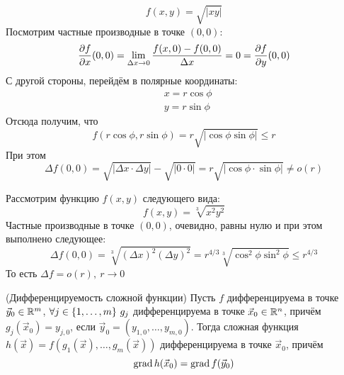 \begin{example}
	\[
		f(x, y) = \sqrt{|xy|}
	\]
	Посмотрим частные производные в точке $(0, 0)$:
	\[
		\frac{\partial f}{\partial x} (0, 0) = \lim\limits_{\Delta x \to 0} \frac{f(x, 0) - f(0, 0)}{\Delta x} = 0 = \frac{\partial f}{\partial y} (0, 0)
	\]
	С другой стороны, перейдём в полярные координаты:
	\begin{align*}
		&{x = r \cos \phi}
		\\
		&{y = r \sin \phi}
	\end{align*}
	Отсюда получим, что
	\[
		f(r \cos \phi, r \sin \phi) = r \sqrt{|\cos \phi \sin \phi|} \le r
	\]
	При этом
	\[
		\Delta f(0, 0) = \sqrt{|\Delta x \cdot \Delta y|} - \sqrt{|0 \cdot 0|} = r \sqrt{|\cos \phi \cdot \sin \phi|} \neq o(r)
	\]
\end{example}
\begin{example}
	Рассмотрим функцию $f(x, y)$ следующего вида:
	\[
		f(x, y) = \sqrt[3]{x^2 y^2}
	\]
	Частные производные в точке $(0, 0)$, очевидно, равны нулю и при этом выполнено следующее:
	\[
		\Delta f(0, 0) = \sqrt[3]{(\Delta x)^2 (\Delta y)^2} = r^{4/3} \sqrt[3]{\cos^2 \phi \sin^2 \phi} \le r^{4/3}
	\]
	То есть $\Delta f = o(r),\ r \to 0$
\end{example}

\begin{theorem} (Дифференцируемость сложной функции)
	Пусть $f$ дифференцируема в точке $\vec{y}_0 \in \mathbb{R}^m$, $\forall j \in \range{m}\ g_j$ дифференцируема в точке $\vec{x}_0 \in \mathbb{R}^n$, причём $g_j(\vec{x}_0) = y_{j, 0}$, если $\vec{y}_0 = (y_{1, 0}, \ldots, y_{m, 0})$. Тогда сложная функция $h(\vec{x}) = f(g_1(\vec{x}), \ldots, g_m(\vec{x}))$ дифференцируема в точке $\vec{x}_0$, причём
	\[
		\operatorname{grad} h(\vec{x}_0) = \operatorname{grad} f(\vec{y}_0)
	\]
\end{theorem}


